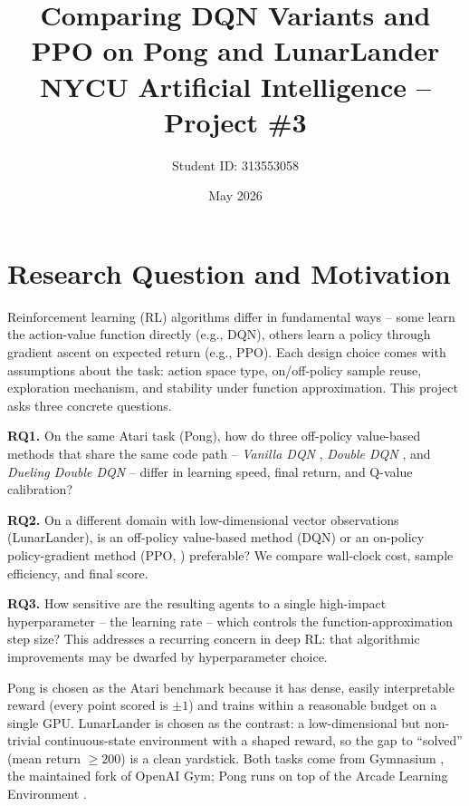 \documentclass[12pt]{article}
\title{Comparing DQN Variants and PPO on Pong and LunarLander \\
\large NYCU Artificial Intelligence -- Project \#3}
\author{Student ID: 313553058}
\date{May 2026}
\begin{document}
\maketitle

\section{Research Question and Motivation}

Reinforcement learning (RL) algorithms differ in fundamental ways -- some
learn the action-value function directly (e.g., DQN), others learn a policy
through gradient ascent on expected return (e.g., PPO). Each design choice
comes with assumptions about the task: action space type, on/off-policy
sample reuse, exploration mechanism, and stability under function
approximation. This project asks three concrete questions.

\textbf{RQ1.} On the same Atari task (Pong), how do three off-policy
value-based methods that share the same code path -- \emph{Vanilla DQN}
\citep{mnih2015human}, \emph{Double DQN} \citep{vanhasselt2016deep}, and
\emph{Dueling Double DQN} \citep{wang2016dueling} -- differ in learning speed,
final return, and Q-value calibration?

\textbf{RQ2.} On a different domain with low-dimensional vector
observations (LunarLander), is an off-policy value-based method (DQN) or an
on-policy policy-gradient method (PPO, \citealp{schulman2017proximal})
preferable? We compare wall-clock cost, sample efficiency, and final score.

\textbf{RQ3.} How sensitive are the resulting agents to a single
high-impact hyperparameter -- the learning rate -- which controls the
function-approximation step size? This addresses a recurring concern in deep
RL: that algorithmic improvements may be dwarfed by hyperparameter choice.

Pong is chosen as the Atari benchmark because it has dense, easily
interpretable reward (every point scored is $\pm1$) and trains within a
reasonable budget on a single GPU. LunarLander is chosen as the contrast: a
low-dimensional but non-trivial continuous-state environment with a
shaped reward, so the gap to ``solved'' (mean return $\geq200$) is a clean
yardstick. Both tasks come from Gymnasium \citep{towers2024gymnasium}, the
maintained fork of OpenAI Gym; Pong runs on top of the Arcade Learning
Environment \citep{bellemare2013arcade}.
\end{document}
